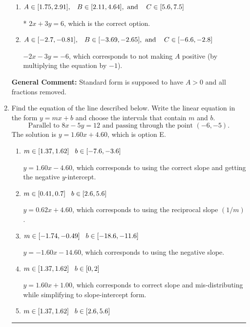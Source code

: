 \documentclass{extbook}[14pt]
\newcommand{\litem}[1]{\item #1

\rule{\textwidth}{0.4pt}}
\begin{document}
\begin{enumerate}
{\begin{enumerate}[label=\Alph*.]
 $0.667x - 1y = -2.0$, which corresponds to using the opposite (negative) slope of the graph and not removing rational values.
\item \( A \in [1.75, 2.91], \hspace{3mm} B \in [2.11, 4.64], \text{ and } \hspace{3mm} C \in [5.6, 7.5] \)

* $2x + 3y = 6$, which is the correct option.
\item \( A \in [-2.7, -0.81], \hspace{3mm} B \in [-3.69, -2.65], \text{ and } \hspace{3mm} C \in [-6.6, -2.8] \)

 $-2x - 3y = -6$, which corresponds to not making $A$ positive (by multiplying the equation by $-1$).
\end{enumerate}

\textbf{General Comment:} Standard form is supposed to have $A > 0$ and all fractions removed.
}
\litem{
Find the equation of the line described below. Write the linear equation in the form $ y=mx+b $ and choose the intervals that contain $m$ and $b$.
\[ \text{Parallel to } 8 x - 5 y = 12 \text{ and passing through the point } (-6, -5). \]The solution is \( y = 1.60x + 4.60 \), which is option E.\begin{enumerate}[label=\Alph*.]
\item \( m \in [1.37, 1.62] \hspace*{3mm} b \in [-7.6, -3.6] \)

 $y = 1.60x - 4.60$, which corresponds to using the correct slope and getting the negative $y$-intercept.
\item \( m \in [0.41, 0.7] \hspace*{3mm} b \in [2.6, 5.6] \)

 $y = 0.62x + 4.60$, which corresponds to using the reciprocal slope $(1/m)$.
\item \( m \in [-1.74, -0.49] \hspace*{3mm} b \in [-18.6, -11.6] \)

 $y = -1.60x - 14.60$, which corresponds to using the negative slope.
\item \( m \in [1.37, 1.62] \hspace*{3mm} b \in [0, 2] \)

 $y = 1.60x + 1.00$, which corresponds to correct slope and mis-distributing while simplifying to slope-intercept form.
\item \( m \in [1.37, 1.62] \hspace*{3mm} b \in [2.6, 5.6] \)


\end{enumerate}}
\end{enumerate}
\end{document}
